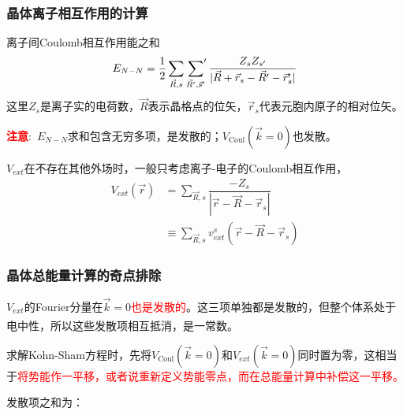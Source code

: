 \documentclass[cjk,slidestop,handout,compress,mathserif,blue]{beamer}	%
\newcommand{\upcite}[1]{\hspace{0ex}\textsuperscript{\cite{#1}}} %
\begin{document}
\frame
{
	\frametitle{晶体离子相互作用的计算}
	离子间\textrm{Coulomb}相互作用能之和
	\begin{displaymath}
		E_{N-N}=\dfrac12\sum_{\vec R,s}\sideset{}{^{\prime}}\sum_{\vec R^{\prime},\vec s^{\prime}}\dfrac{Z_sZ_{s^{\prime}}}{|\vec R+\vec r_s-\vec R^{\prime}-\vec r_s^{\prime}|}
	\end{displaymath}
	这里$Z_s$是离子实的电荷数，$\vec R$表示晶格点的位矢，$\vec r_s$代表元胞内原子的相对位矢。

	\textcolor{red}{\textbf{注意}}:~$E_{N-N}$求和包含无穷多项，是发散的；$V_{\mathrm{Coul}}(\vec k=0)$也发散。
	
	$V_{ext}$在不存在其他外场时，一般只考虑离子-电子的\textrm{Coulomb}相互作用，
	\begin{displaymath}
		\begin{aligned}
			V_{ext}(\vec r)&=\sum_{\vec R,s}\dfrac{-Z_s}{|\vec r-\vec R-\vec r_s|}\\
			&\equiv\sum_{\vec R,s}v_{ext}^s(\vec r-\vec R-\vec r_s)
		\end{aligned}
	\end{displaymath}
}

\frame
{
	\frametitle{晶体总能量计算的奇点排除}
	$V_{ext}$的\textrm{Fourier}分量在$\vec k=0$\textcolor{red}{也是发散的}。这三项单独都是发散的，但整个体系处于电中性，所以这些发散项相互抵消，是一常数。\upcite{Xie_Lu}

求解\textrm{Kohn-Sham}方程时，先将$V_{\mathrm{Coul}}(\vec k=0)$和$V_{ext}(\vec k=0)$同时置为零，这相当于\textcolor{red}{将势能作一平移，或者说重新定义势能零点，而在总能量计算中补偿这一平移。}

	发散项之和为：
	{\fontsize{8.5pt}{7.2pt}}
}
\end{document}
